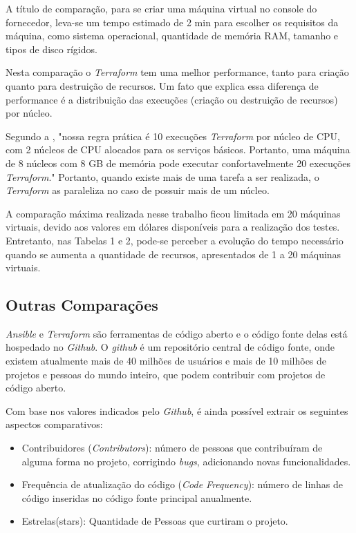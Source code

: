 A título de comparação, para se criar uma máquina virtual no console do fornecedor, leva-se um tempo estimado de 2 min para escolher os requisitos da máquina, como sistema operacional, quantidade de memória RAM, tamanho e tipos de disco rígidos. 

Nesta comparação o \textit{Terraform} tem uma melhor performance, tanto para criação quanto para destruição de recursos. Um fato que explica essa diferença de performance é a distribuição das execuções (criação ou destruição de recursos) por núcleo. 

Segundo a , "nossa regra prática é 10 execuções \textit{Terraform} por núcleo de CPU, com 2 núcleos de CPU alocados para os serviços básicos.  Portanto, uma máquina de 8 núcleos com 8 GB de memória pode executar confortavelmente 20 execuções \textit{Terraform}." Portanto, quando existe mais de uma tarefa a ser realizada, o \textit{Terraform} as paraleliza no caso de possuir mais de um núcleo.

A comparação máxima realizada nesse trabalho ficou limitada em 20 máquinas virtuais, devido aos valores em dólares disponíveis para a realização dos testes. Entretanto, nas Tabelas 1 e 2, pode-se perceber a evolução do tempo necessário quando se aumenta a quantidade de recursos, apresentados de 1 a 20 máquinas virtuais.

\subsection{Outras Comparações}
\textit{Ansible} e \textit{Terraform} são ferramentas de código aberto e o código fonte delas está hospedado no \textit{Github}. O \textit{github} é um repositório central de código fonte, onde existem atualmente mais de 40 milhões de usuários e mais de 10 milhões de projetos e pessoas do mundo inteiro, que podem contribuir com projetos de código aberto. 

Com base nos valores indicados pelo \textit{Github}, é ainda possível extrair os seguintes aspectos comparativos: 

\begin{itemize}
    \item  Contribuidores (\textit{Contributors}): número de pessoas que contribuíram de alguma forma no projeto, corrigindo \textit{bugs}, adicionando novas funcionalidades.
     \item Frequência de atualização do código (\textit{Code Frequency}): número de linhas de código inseridas no código fonte principal anualmente. 
     \item Estrelas(stars): Quantidade de Pessoas que curtiram o projeto.
\end{itemize}

